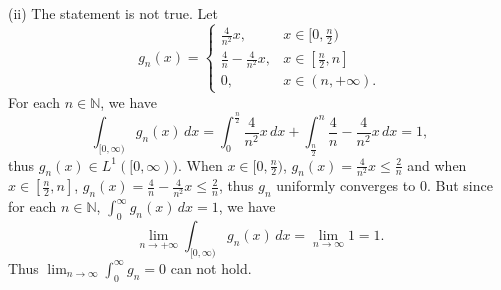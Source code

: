 \documentclass[12pt,a4paper]{ctexart}
\begin{document}
(ii) The statement is not true. Let
\begin{equation*}
g_{n}(x) =
\left\{
             \begin{array}{cl}
             \frac{4}{n^{2}} x, & x \in [0, \frac{n}{2}) \\
             \frac{4}{n} - \frac{4}{n^{2}} x, & x \in [\frac{n}{2}, n]  \\
             0, & x \in (n, + \infty).
             \end{array}
\right.
\end{equation*}
For each $n \in \mathbb{N}$, we have
\begin{equation*}
    \int_{[0, \infty)}^{} g_{n} (x) \, d x = \int_{0}^{\frac{n}{2}} \frac{4}{n^{2}} x \, d x + \int_{\frac{n}{2}}^{n} \frac{4}{n} - \frac{4}{n^{2}} x \, d x = 1,
\end{equation*}
thus $g_{n} (x) \in L^{1}([0, \infty))$. When $x \in [0, \frac{n}{2})$, $g_{n}(x) = \frac{4}{n^{2}} x \leq \frac{2}{n}$ and when $x \in [\frac{n}{2}, n]$, $g_{n} (x) = \frac{4}{n} - \frac{4}{n^{2}} x \leq \frac{2}{n}$, thus $g_{n}$ uniformly converges to $0$. But since for each $n \in \mathbb{N}$, $\int_{0}^{\infty} g_{n}(x) \, d x  = 1$, we have
\begin{equation*}
    \lim_{n \to + \infty} \int_{[0, \infty)}^{} g_{n} (x) \, d x = \lim_{n \to \infty} 1 = 1.
\end{equation*}
Thus $\lim_{n \to \infty} \int_{0}^{\infty} g_{n} = 0$ can not hold.
\end{document}
